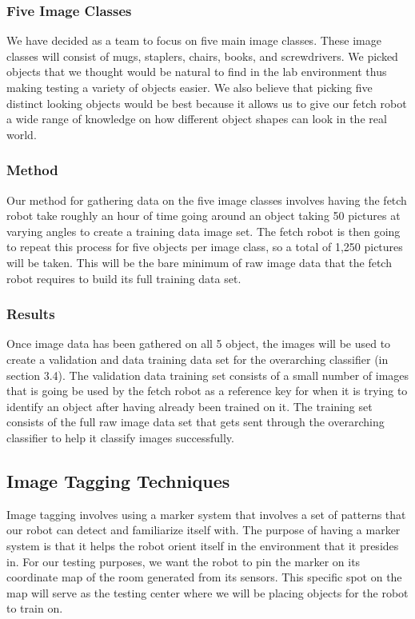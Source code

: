 \documentclass[draftclsnofoot, onecolumn, 10pt, compsoc]{IEEEtran}
\begin{document}
			\subsubsection{Five Image Classes}
				We have decided as a team to focus on five main image classes. These image classes will consist of mugs, staplers, chairs, books, and screwdrivers. We picked objects that we thought would be natural to find in the lab environment thus making testing a variety of objects easier. We also believe that picking five distinct looking objects would be best because it allows us to give our fetch robot a wide range of knowledge on how different object shapes can look in the real world.

			\subsubsection{Method}
				Our method for gathering data on the five image classes involves having the fetch robot take roughly an hour of time going around an object taking 50 pictures at varying angles to create a training data image set. The fetch robot is then going to repeat this process for five objects per image class, so a total of 1,250 pictures will be taken. This will be the bare minimum of raw image data that the fetch robot requires to build its full training data set.

			\subsubsection{Results}
				Once image data has been gathered on all 5 object, the images will be used to create a validation and data training data set for the overarching classifier (in section 3.4). The validation data training set consists of a small number of images that is going be used by the fetch robot as a reference key for when it is trying to identify an object after having already been trained on it. The training set consists of the full raw image data set that gets sent through the overarching classifier to help it classify images successfully.

		\subsection{Image Tagging Techniques}
			Image tagging involves using a marker system that involves a set of patterns that our robot can detect and familiarize itself with. The purpose of having a marker system is that it helps the robot orient itself in the environment that it presides in. For our testing purposes, we want the robot to pin the marker on its coordinate map of the room generated from its sensors. This specific spot on the map will serve as the testing center where we will be placing objects for the robot to train on.
\end{document}
